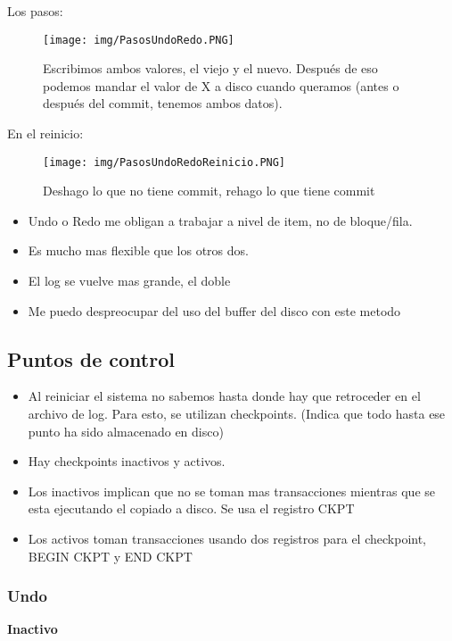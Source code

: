 Los pasos:
\begin{figure}[!htb]
    \centering
    \texttt{[image: img/PasosUndoRedo.PNG]}
    \caption{Escribimos ambos valores, el viejo y el nuevo. Después de eso podemos mandar el valor de X a disco cuando queramos (antes o después del commit, tenemos ambos datos).}
\end{figure}

En el reinicio:
\begin{figure}[!htb]
    \centering
    \texttt{[image: img/PasosUndoRedoReinicio.PNG]}
    \caption{Deshago lo que no tiene commit, rehago lo que tiene commit}
\end{figure}

\begin{itemize}
    \item Undo o Redo me obligan a trabajar a nivel de item, no de bloque/fila.
    \item Es mucho mas flexible que los otros dos.
    \item El log se vuelve mas grande, el doble
    \item Me puedo despreocupar del uso del buffer del disco con este metodo
\end{itemize}

\newpage
\subsection*{Puntos de control}

\begin{itemize}
\item Al reiniciar el sistema no sabemos hasta donde hay que retroceder en el archivo de log. Para esto, se utilizan checkpoints. (Indica que todo hasta ese punto ha sido almacenado en disco)
\item Hay checkpoints inactivos y activos.
\item Los inactivos implican que no se toman mas transacciones mientras que se esta ejecutando el copiado a disco. Se usa el registro CKPT
\item Los activos toman transacciones usando dos registros para el checkpoint, BEGIN CKPT y END CKPT
\end{itemize}


\subsubsection*{Undo}

\textbf{Inactivo}

